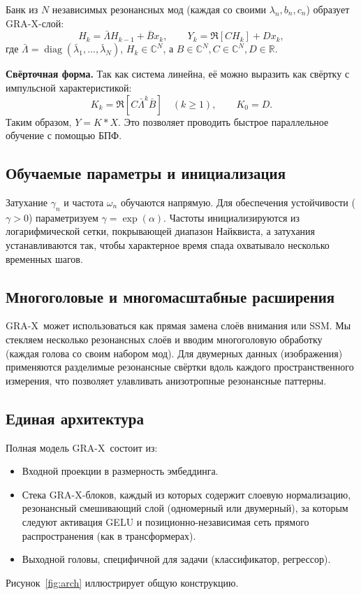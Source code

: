 \documentclass{article}
\newcommand{\R}{\mathbb{R}}
\newcommand{\C}{\mathbb{C}}
\newcommand{\GRA}{\textsc{GRA-X}}
\begin{document}
Банк из \(N\) независимых резонансных мод (каждая со своими \(\lambda_n, b_n, c_n\)) образует \GRA-слой:
\begin{equation}
  H_k = \bar{\Lambda} H_{k-1} + \bar{B} x_k, \qquad Y_k = \Re\left[ C H_k \right] + D x_k,
\end{equation}
где \(\bar{\Lambda} = \operatorname{diag}(\bar{\lambda}_1,\dots,\bar{\lambda}_N)\), \(H_k\in\C^N\), а \(B\in\C^N, C\in\C^N, D\in\R\).

\textbf{Свёрточная форма.}
Так как система линейна, её можно выразить как свёртку с импульсной характеристикой:
\begin{equation}
  K_k = \Re\left[ C \bar{\Lambda}^{k} \bar{B} \right] \quad (k\ge 1), \qquad K_0 = D.
\end{equation}
Таким образом, \(Y = K * X\). Это позволяет проводить быстрое параллельное обучение с помощью БПФ.

\subsection{Обучаемые параметры и инициализация}
Затухание \(\gamma_n\) и частота \(\omega_n\) обучаются напрямую. Для обеспечения устойчивости (\(\gamma>0\)) параметризуем \(\gamma = \exp(\alpha)\). Частоты инициализируются из логарифмической сетки, покрывающей диапазон Найквиста, а затухания устанавливаются так, чтобы характерное время спада охватывало несколько временных шагов.

\subsection{Многоголовые и многомасштабные расширения}
\GRA\ может использоваться как прямая замена слоёв внимания или SSM. Мы стекляем несколько резонансных слоёв и вводим многоголовую обработку (каждая голова со своим набором мод). Для двумерных данных (изображения) применяются разделимые резонансные свёртки вдоль каждого пространственного измерения, что позволяет улавливать анизотропные резонансные паттерны.

\subsection{Единая архитектура}
Полная модель \GRA\ состоит из:
\begin{itemize}
  \item Входной проекции в размерность эмбеддинга.
  \item Стека \GRA-блоков, каждый из которых содержит слоевую нормализацию, резонансный смешивающий слой (одномерный или двумерный), за которым следуют активация GELU и позиционно-независимая сеть прямого распространения (как в трансформерах).
  \item Выходной головы, специфичной для задачи (классификатор, регрессор).
\end{itemize}
Рисунок~\ref{fig:arch} иллюстрирует общую конструкцию.
\end{document}
